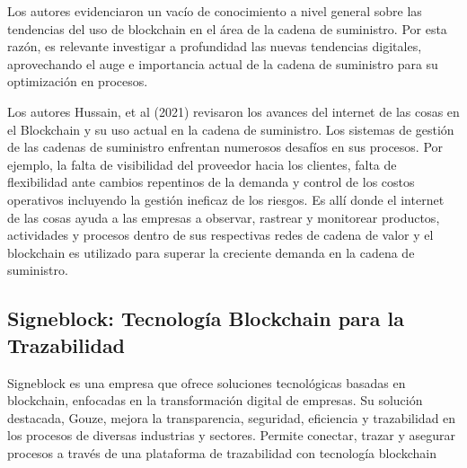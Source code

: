 \documentclass[main.tex]{subfiles}
\begin{document}
Los autores evidenciaron un vacío de conocimiento a nivel general sobre las tendencias del uso de blockchain en el área de la cadena de suministro. Por esta razón, es relevante investigar a profundidad las nuevas tendencias digitales, aprovechando el auge e importancia actual de la cadena de suministro para su optimización en procesos. \cite{torres2022tendencias}

Los autores Hussain, et al (2021) revisaron los avances del internet de las cosas en el
Blockchain y su uso actual en la cadena de suministro. Los sistemas de gestión de las cadenas de
suministro enfrentan numerosos desafíos en sus procesos. Por ejemplo, la falta de visibilidad del
proveedor hacia los clientes, falta de flexibilidad ante cambios repentinos de la demanda y control
de los costos operativos incluyendo la gestión ineficaz de los riesgos. Es allí donde el internet de
las cosas ayuda a las empresas a observar, rastrear y monitorear productos, actividades y procesos
dentro de sus respectivas redes de cadena de valor y el blockchain es utilizado para superar la
creciente demanda en la cadena de suministro.

\subsection{Signeblock: Tecnología Blockchain para la Trazabilidad}

Signeblock es una empresa que ofrece soluciones tecnológicas basadas en blockchain, enfocadas en la transformación digital de empresas. Su solución destacada, Gouze, mejora la transparencia, seguridad, eficiencia y trazabilidad en los procesos de diversas industrias y sectores. Permite conectar, trazar y asegurar procesos a través de una plataforma de trazabilidad con tecnología blockchain \cite{signeblock2024}
\end{document}
